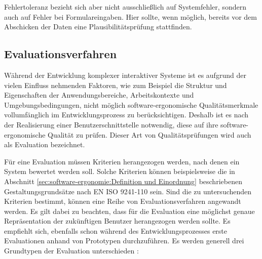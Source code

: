 Fehlertoleranz bezieht sich aber nicht ausschließlich auf Systemfehler, sondern auch auf Fehler bei Formulareingaben. Hier sollte, wenn möglich, bereits vor dem Abschicken der Daten eine Plausibilitätsprüfung stattfinden.


%

\subsection{Evaluationsverfahren}

Während der Entwicklung komplexer interaktiver Systeme ist es aufgrund der vielen Einfluss nehmenden Faktoren, wie zum Beispiel die Struktur und Eigenschaften der Anwendungsbereiche, Arbeitskontexte und Umgebungsbedingungen, nicht möglich software-ergonomische Qualitätsmerkmale vollumfänglich im Entwicklungsprozess zu berücksichtigen. Deshalb ist es nach der Realisierung einer Benutzerschnittstelle notwendig, diese auf ihre software-ergonomische Qualität zu prüfen. Dieser Art von Qualitätsprüfungen wird auch als Evaluation bezeichnet. \parencite[vgl.][207]{Herczeg2009}

Für eine Evaluation müssen Kriterien herangezogen werden, nach denen ein System bewertet werden soll. Solche Kriterien können beispielsweise die in Abschnitt \ref{sec:software-ergonomie:Definition und Einordnung} beschriebenen Gestaltungsgrundsätze nach EN ISO 9241-110 sein. Sind die zu untersuchenden Kriterien bestimmt, können eine Reihe von Evaluationsverfahren angewandt werden. Es gilt dabei zu beachten, dass für die Evaluation eine möglichst genaue Repräsentation der zukünftigen Benutzer herangezogen werden sollte. Es empfiehlt sich, ebenfalls schon während des Entwicklungsprozesses erste Evaluationen anhand von Prototypen durchzuführen. \parencite[vgl.][208]{Herczeg2009} Es werden generell drei Grundtypen der Evaluation unterschieden \parencite[894\psqq]{Karat1988}:

